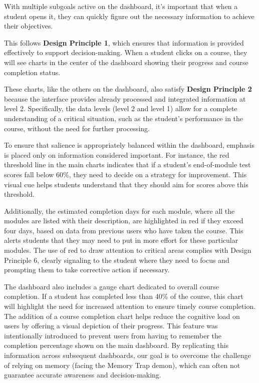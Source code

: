 With multiple subgoals active on the dashboard, it’s important that when a student opens it, they can quickly figure out the necessary information to achieve their objectives. 

This follows \textbf{Design Principle 1}, which ensures that information is provided effectively to support decision-making. When a student clicks on a course, they will see charts in the center of the dashboard showing their progress and course completion status.

These charts, like the others on the dashboard, also satisfy \textbf{Design Principle 2} because the interface provides already processed and integrated information at level 2. Specifically, the data levels (level 2 and level 1) allow for a complete understanding of a critical situation, such as the student's performance in the course, without the need for further processing.

To ensure that salience is appropriately balanced within the dashboard, emphasis is placed only on information considered important. For instance, the red threshold line in the main charts indicates that if a student's end-of-module test scores fall below 60\%, they need to decide on a strategy for improvement. This visual cue helps students understand that they should aim for scores above this threshold.

Additionally, the estimated completion days for each module, where all the modules are listed with their description, are highlighted in red if they exceed four days, based on data from previous users who have taken the course. This alerts students that they may need to put in more effort for these particular modules.
The use of red to draw attention to critical areas complies with Design Principle 6, clearly signaling to the student where they need to focus and prompting them to take corrective action if necessary.

The dashboard also includes a gauge chart dedicated to overall course completion. If a student has completed less than 40\% of the course, this chart will highlight the need for increased attention to ensure timely course completion.
The addition of a course completion chart helps reduce the cognitive load on users by offering a visual depiction of their progress. This feature was intentionally introduced to prevent users from having to remember the completion percentage shown on the main dashboard. By replicating this information across subsequent dashboards, our goal is to overcome the challenge of relying on memory (facing the Memory Trap demon), which can often not guarantee accurate awareness and decision-making.

